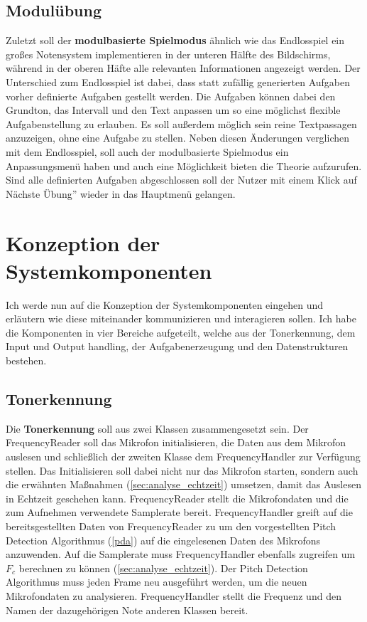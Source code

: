 \subsection{Modulübung}
Zuletzt soll der \textbf{modulbasierte Spielmodus} ähnlich wie das Endlosspiel ein großes Notensystem implementieren in der unteren Hälfte des Bildschirms, während in der oberen Häfte alle relevanten Informationen angezeigt werden. Der Unterschied zum Endlosspiel ist dabei, dass statt zufällig generierten Aufgaben vorher definierte Aufgaben gestellt werden. Die Aufgaben können dabei den Grundton, das Intervall und den Text anpassen um so eine möglichst flexible Aufgabenstellung zu erlauben. Es soll außerdem möglich sein reine Textpassagen anzuzeigen, ohne eine Aufgabe zu stellen. Neben diesen Änderungen verglichen mit dem Endlosspiel, soll auch der modulbasierte Spielmodus ein Anpassungsmenü haben und auch eine Möglichkeit bieten die Theorie aufzurufen. Sind alle definierten Aufgaben abgeschlossen soll der Nutzer mit einem Klick auf \glqq Nächste Übung'' wieder in das Hauptmenü gelangen. 

\section{Konzeption der Systemkomponenten}

%

Ich werde nun auf die Konzeption der Systemkomponenten eingehen und erläutern wie diese miteinander kommunizieren und interagieren sollen. Ich habe die Komponenten in vier Bereiche aufgeteilt, welche aus der Tonerkennung, dem Input und Output handling, der Aufgabenerzeugung und den Datenstrukturen bestehen.\\
\subsection{Tonerkennung}

Die \textbf{Tonerkennung} soll aus zwei Klassen zusammengesetzt sein. Der FrequencyReader soll das Mikrofon initialisieren, die Daten aus dem Mikrofon auslesen und schließlich der zweiten Klasse dem FrequencyHandler zur Verfügung stellen. Das Initialisieren soll dabei nicht nur das Mikrofon starten, sondern auch die erwähnten Maßnahmen (\ref{sec:analyse_echtzeit}) umsetzen, damit das Auslesen in Echtzeit geschehen kann. FrequencyReader stellt die Mikrofondaten und die zum Aufnehmen verwendete Samplerate bereit. FrequencyHandler greift auf die bereitsgestellten Daten von FrequencyReader zu um den vorgestellten Pitch Detection Algorithmus (\ref{pda}) auf die eingelesenen Daten des Mikrofons anzuwenden. Auf die Samplerate muss FrequencyHandler ebenfalls zugreifen um $F_c$ berechnen zu können (\ref{sec:analyse_echtzeit}). Der Pitch Detection Algorithmus muss jeden Frame neu ausgeführt werden, um die neuen Mikrofondaten zu analysieren. FrequencyHandler stellt die Frequenz und den Namen der dazugehörigen Note anderen Klassen bereit.\\

